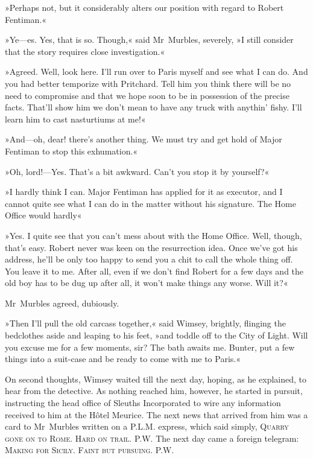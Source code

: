 »Perhaps not, but it considerably alters our position with regard to Robert Fentiman.«

»Ye—es. Yes, that is so. Though,« said Mr~Murbles, severely, »I still consider that the story requires close investigation.«

»Agreed. Well, look here. I'll run over to Paris myself and see what I can do. And you had better temporize with Pritchard. Tell him you think there will be no need to compromise and that we hope soon to be in possession of the precise facts. That'll show him we don't mean to have any truck with anythin' fishy. I'll learn him to cast nasturtiums at me!«

»And—oh, dear! there's another thing. We must try and get hold of Major Fentiman to stop this exhumation.«

»Oh, lord!—Yes. That's a bit awkward. Can't you stop it by yourself?«

»I hardly think I can. Major Fentiman has applied for it as executor, and I cannot quite see what I can do in the matter without his signature. The Home Office would hardly\longdash«

»Yes. I quite see that you can't mess about with the Home Office. Well, though, that's easy. Robert never was keen on the resurrection idea. Once we've got his address, he'll be only too happy to send you a chit to call the whole thing off. You leave it to me. After all, even if we don't find Robert for a few days and the old boy has to be dug up after all, it won't make things any worse. Will it?«

Mr~Murbles agreed, dubiously.

»Then I'll pull the old carcass together,« said Wimsey, brightly, flinging the bedclothes aside and leaping to his feet, »and toddle off to the City of Light. Will you excuse me for a few moments, sir? The bath awaits me. Bunter, put a few things into a suit-case and be ready to come with me to Paris.«

On second thoughts, Wimsey waited till the next day, hoping, as he explained, to hear from the detective. As nothing reached him, however, he started in pursuit, instructing the head office of Sleuths Incorporated to wire any information received to him at the Hôtel Meurice. The next news that arrived from him was a card to Mr~Murbles written on a P\@.L\@.M\@. express, which said simply, \textsc{Quarry gone on to Rome. Hard on trail. P\@.W\@.} The next day came a foreign telegram: \textsc{Making for Sicily. Faint but pursuing. P\@.W\@.}

